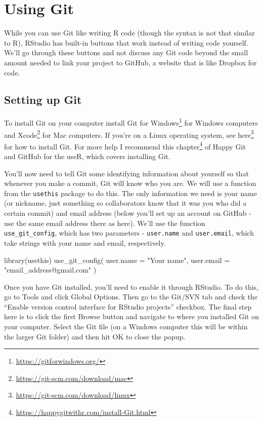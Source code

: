 \documentclass[
]{krantz}
\makeatletter
\newenvironment{Shaded}{\begin{snugshade}}{\end{snugshade}}
\newcommand{\AttributeTok}[1]{\textcolor[rgb]{0.61,0.61,0.61}{#1}}
\newcommand{\FunctionTok}[1]{\textcolor[rgb]{0,0,0}{#1}}
\newcommand{\NormalTok}[1]{#1}
\newcommand{\StringTok}[1]{\textcolor[rgb]{0.5,0.5,0.5}{#1}}
\renewcommand{\href}[2]{#2\footnote{\url{#1}}}
\newenvironment{kframe}{%
\medskip{}
\setlength{\fboxsep}{.8em}
 \def\at@end@of@kframe{}%
 \ifinner\ifhmode%
  \def\at@end@of@kframe{\end{minipage}}%
  \begin{minipage}{\columnwidth}%
 \fi\fi%
 \def\FrameCommand##1{\hskip\@totalleftmargin \hskip-\fboxsep
 \colorbox{shadecolor}{##1}\hskip-\fboxsep
     \hskip-\linewidth \hskip-\@totalleftmargin \hskip\columnwidth}%
 \MakeFramed {\advance\hsize-\width
   \@totalleftmargin\z@ \linewidth\hsize
   \@setminipage}}%
 {\par\unskip\endMakeFramed%
 \at@end@of@kframe}
\renewenvironment{Shaded}{\begin{kframe}}{\end{kframe}}
\makeatother
\begin{document}
\hypertarget{using-git}{%
\section{Using Git}\label{using-git}}

While you can use Git like writing R code (though the syntax
is not that similar to R), RStudio has built-in buttons that
work instead of writing code yourself. We'll go through
these buttons and not discuss any Git code beyond the small
amount needed to link your project to GitHub, a website that
is like Dropbox for code.

\hypertarget{setting-up-git}{%
\subsection{Setting up Git}\label{setting-up-git}}

To install Git on your computer install
\href{https://gitforwindows.org/}{Git for Windows} for
Windows computers and
\href{https://git-scm.com/download/mac}{Xcode} for Mac
computers. If you're on a Linux operating system, see
\href{https://git-scm.com/download/linux}{here} for how to
install Git. For more help I recommend
\href{https://happygitwithr.com/install-Git.html}{this
chapter} of Happy Git and GitHub for the useR, which covers
installing Git.

You'll now need to tell Git some identifying information
about yourself so that whenever you make a commit, Git will
know who you are. We will use a function from the
\texttt{usethis} package to do this. The only information we
need is your name (or nickname, just something so
collaborators know that it was you who did a certain commit)
and email address (below you'll set up an account on GitHub
- use the same email address there as here). We'll use the
function \texttt{use\_git\_config}, which has two parameters
- \texttt{user.name} and \texttt{user.email}, which take
strings with your name and email, respectively.

\begin{Shaded}
\begin{Highlighting}[]
\FunctionTok{library}\NormalTok{(usethis)}
\FunctionTok{use\_git\_config}\NormalTok{(}
  \AttributeTok{user.name =} \StringTok{"Your name"}\NormalTok{,}
  \AttributeTok{user.email =} \StringTok{"email\_address@gmail.com"}
\NormalTok{)}
\end{Highlighting}
\end{Shaded}

Once you have Git installed, you'll need to enable it
through RStudio. To do this, go to Tools and click Global
Options. Then go to the Git/SVN tab and check the ``Enable
version control interface for RStudio projects'' checkbox.
The final step here is to click the first Browse button and
navigate to where you installed Git on your computer. Select
the Git file (on a Windows computer this will be within the
larger Git folder) and then hit OK to close the popup.
\end{document}
